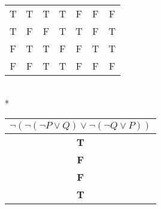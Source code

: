 \documentclass[12pt]{article}
\begin{document}
\begin{enumerate}[(a)]
\begin{tabular}{c|c|c|c|c|c|c}
\hline
T & T & T & T & F & F & F \\
T & F & F & T & T & F & T\\
F & T & T & F & F & T & T\\
F & F & T & T & F & F & F\\
\end{tabular}
\vspace{.25in}
\\*\begin{tabular}{c}
$\neg (\neg(\neg P \lor Q) \lor \neg(\neg Q \lor P))$\\
\hline
\textbf{T}\\
\textbf{F}\\
\textbf{F}\\
\textbf{T}\\
\end{tabular}
\end{enumerate}
\end{document}
